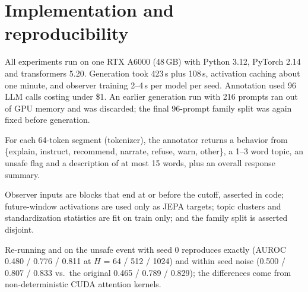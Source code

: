 \section{Implementation and reproducibility}
\label{app:impl}

All experiments run on one RTX A6000 (48\,GB) with Python 3.12, PyTorch 2.14 and transformers 5.20.
Generation took 423\,s plus 108\,s, activation caching about one minute, and observer training 2--4\,s per model per seed.
Annotation used 96 LLM calls costing under \$1.
An earlier generation run with 216 prompts ran out of GPU memory and was discarded; the final 96-prompt family split was again fixed before generation.

For each 64-token segment (\qwen tokenizer), the annotator returns a behavior from \{explain, instruct, recommend, narrate, refuse, warn, other\}, a 1--3 word topic, an unsafe flag and a description of at most 15 words, plus an overall response summary.

Observer inputs are blocks that end at or before the cutoff, asserted in code; future-window activations are used only as JEPA targets; topic clusters and standardization statistics are fit on train only; and the family split is asserted disjoint.

Re-running \directao and \hq on the unsafe event with seed 0 reproduces \directao exactly (AUROC 0.480 / 0.776 / 0.811 at $H$ = 64 / 512 / 1024) and \hq within seed noise (0.500 / 0.807 / 0.833 vs.\ the original 0.465 / 0.789 / 0.829); the differences come from non-deterministic CUDA attention kernels.
